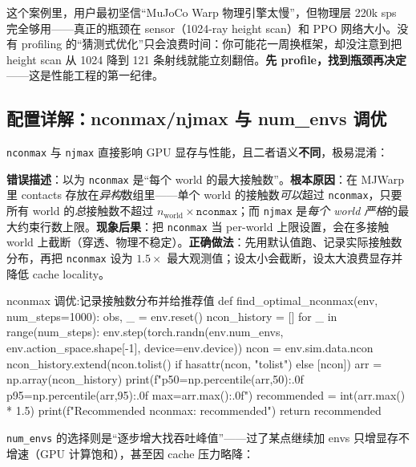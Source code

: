 \begin{insight}\label{ins:rlmc-ls-perf-guess}
这个案例里，用户最初坚信“MuJoCo Warp 物理引擎太慢”，但物理层 220k sps 完全够用——真正的瓶颈在 sensor（1024-ray height scan）和 PPO 网络大小。没有 profiling 的“猜测式优化”只会浪费时间：你可能花一周换框架，却没注意到把 height scan 从 1024 降到 121 条射线就能立刻翻倍。\textbf{先 profile，找到瓶颈再决定}——这是性能工程的第一纪律。
\end{insight}

\subsection{配置详解：nconmax/njmax 与 num\_envs 调优}
\label{sec:rlmc-ls-nconmax}

\verb|nconmax| 与 \verb|njmax| 直接影响 GPU 显存与性能，且二者语义\textbf{不同}，极易混淆：

\begin{pitfall}
\textbf{错误描述}：以为 \verb|nconmax| 是“每个 world 的最大接触数”。\textbf{根本原因}：在 MJWarp 里 contacts 存放在\emph{异构}数组里——单个 world 的接触数\emph{可以}超过 \verb|nconmax|，只要所有 world 的\emph{总}接触数不超过 $n_{\text{world}}\times\texttt{nconmax}$；而 \verb|njmax| 是\emph{每个 world 严格}的最大约束行数上限。\textbf{现象后果}：把 \verb|nconmax| 当 per-world 上限设置，会在多接触 world 上截断（穿透、物理不稳定）。\textbf{正确做法}：先用默认值跑、记录实际接触数分布，再把 \verb|nconmax| 设为 $1.5\times$ 最大观测值；设太小会截断，设太大浪费显存并降低 cache locality。
\end{pitfall}

\begin{codebox}[Python]{nconmax 调优:记录接触数分布并给推荐值}
def find_optimal_nconmax(env, num_steps=1000):
    obs, _ = env.reset()
    ncon_history = []
    for _ in range(num_steps):
        env.step(torch.randn(env.num_envs, env.action_space.shape[-1], device=env.device))
        ncon = env.sim.data.ncon
        ncon_history.extend(ncon.tolist() if hasattr(ncon, "tolist") else [ncon])
    arr = np.array(ncon_history)
    print(f"p50={np.percentile(arr,50):.0f} p95={np.percentile(arr,95):.0f} max={arr.max():.0f}")
    recommended = int(arr.max() * 1.5)
    print(f"Recommended nconmax: {recommended}")
    return recommended
\end{codebox}

\verb|num_envs| 的选择则是“逐步增大找吞吐峰值”——过了某点继续加 envs 只增显存不增速（GPU 计算饱和），甚至因 cache 压力略降：

